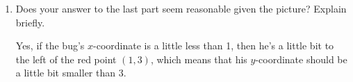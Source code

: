 \documentclass{article}
\begin{document}
\begin{enumerate}
\begin{enumerate}[resume]
\begin{enumerate}
      \begin{problemonly}
        \textbf{Your answer}: The bug's approximate $y$-coordinate is
        \fitb{2in}{}
      \end{problemonly}

      \begin{solution}
        Near $(1, 3)$, the line $y - 3 = \frac{7}{2} (x - 1)$ should be
        very close to the graph of the actual curve $x^4 = 5x^2 - (x^2 -
        y)^2$.  So, the point on the \emph{line} with $x$-coordinate $0.9$
        should be a good approximation for the point on the \emph{curve}
        with $x = 0.9$.  The line can be rewritten as $y = 3 + \frac{7}{2}
        (x - 1)$, and if we plug in $x = 0.9$, we get $y = 3 + \frac{7}{2}
        (0.9 - 1) = 3 + 3.5 (-0.1) = 3 - 0.35 = \boxed{2.65}$. 
      \end{solution}

    \item
      \begin{problem}[\vfill\newpage]
        Does your answer to the last part
        seem reasonable given the picture?  Explain briefly.
      \end{problem}

      \begin{solution}
        Yes, if the bug's $x$-coordinate is a little less than 1, then
        he's a little bit to the left of the red point $(1, 3)$, which
        means that his $y$-coordinate should be a little bit smaller than
        3. 
      \end{solution}

    \end{enumerate}

  \end{enumerate}

  \end{enumerate}
\end{document}
